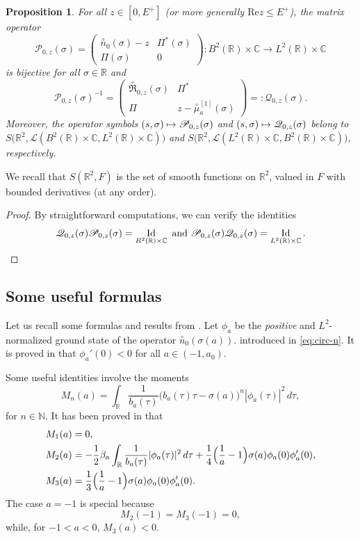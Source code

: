 \documentclass[10pt]{amsart}
\newcommand\mto{\mathchoice{\longmapsto}{\mapsto}{\mapsto}{\mapsto}}
\DeclareMathOperator{\Id}{Id}
\theoremstyle{plain}
\newtheorem{proposition}[theorem]{Proposition}
\theoremstyle{definition}
\newcommand{\R}{\mathbb{R}}
\newcommand{\C}{\mathbb{C}}
\renewcommand{\Re}{\mathrm{Re}}
\begin{document}
\begin{proposition}\label{prop.Grushin0}
For all $ z\in [0,E^+]$ (or more generally $\Re z\leq E^+$), the matrix operator
\[
\mathscr{P}_{0,z}(\sigma)=\begin{pmatrix}
\overset{\circ}{n}_0(\sigma)-z&\Pi^*(\sigma)\\
\Pi(\sigma)&0
\end{pmatrix} : B^2(\R)\times\C\to L^2(\R)\times\C
\]
is bijective for all $\sigma\in\R$ and
\[
\mathscr{P}_{0,z}(\sigma)^{-1}=\begin{pmatrix}
\overset{\circ}{\mathfrak R}_{0,z}(\sigma)&\Pi^*\\
\Pi&z-\overset{\circ}{\mu}^{[1]}_a(\sigma)
\end{pmatrix}=:\mathscr{Q}_{0,z}(\sigma).
\]
Moreover, the operator symbols $(s,\sigma) \mto \mathscr{P}_{0,z}(\sigma)$ and $(s,\sigma) \mto \mathscr{Q}_{0,z}(\sigma)$ belong to $S\bigl(\R^2,\mathscr{L}(B^2(\R)\times\C, L^2(\R)\times\C)\bigr)$ and $
S\bigl(\R^2,\mathscr{L}(L^2(\R)\times\C, B^2(\R)\times\C)\bigr)$, respectively.
\end{proposition}
We recall that $S(\R^2,F)$ is the set of smooth functions on $\R^2$, valued in $F$ with bounded derivatives (at any order).

\begin{proof}
By straightforward computations, we can verify the identities
\begin{equation*}
\mathscr Q_{0,z}(\sigma)\mathscr P_{0,z}(\sigma)=\Id_{B^2(\R)\times \C} \mbox{ and } \mathscr P_{0,z}(\sigma)\mathscr Q_{0,z}(\sigma)=\Id_{L^2(\R)\times\C}.\qedhere
\end{equation*}
\end{proof}

\subsection{Some useful formulas}\label{sec:uf}
Let us recall some formulas and results from \cite{AK20}. Let $\phi_a$ be the \emph{positive} and $L^2$-normalized ground state of the operator $\overset{\circ}{n}_0(\sigma(a))$. introduced in \eqref{eq:circ-n}. It is proved in \cite[Th.\,1.1]{AK20} that $\phi_a'(0)<0$ for all $a\in(-1,a_0)$.

Some useful identities involve the moments
\begin{equation}\label{eq:moments}
M_n(a)=\int_{\mathbb R}\frac 1{b_a(\tau)}\bigl(b_a(\tau)\tau-\sigma(a)\bigr)^n|\phi_a(\tau)|^2\,d\tau, \end{equation}
for $n\in \mathbb N $.
It has been proved in \cite{AK20} that
\begin{align}
M_1(a)&=0,\label{eq:m1}\\
M_2(a)&=-\frac 12 \beta_a\int_{\mathbb R}\frac 1{b_a(\tau)}|\phi_a(\tau)|^2\,d\tau+\frac 14\Bigl(\frac 1a-1\Bigr)\sigma(a)\phi_a(0)\phi_a'(0), \label{eq:m2}\\
M_3(a)&=\frac 13\Bigl(\frac 1a-1\Bigr)\sigma(a)\phi_a(0)\phi_a'(0).\label{eq:m3*}
\end{align}
The case $a=-1$ is special because
\[
M_2(-1)=M_3(-1)=0,
\]
while, for $-1<a<0$, $M_3(a)<0$.
\end{document}
